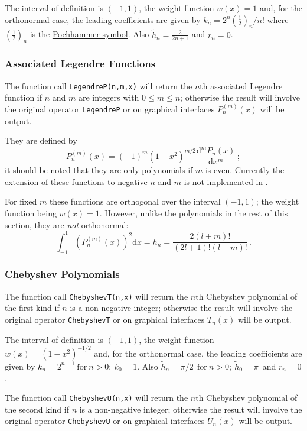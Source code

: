The interval of definition is $(-1, 1)$, the weight function $w(x)=1$ and,
for the orthonormal case, the leading coefficients are given by
$k_n=2^n (\frac{1}{2})_n/n!$ where $(\frac{1}{2})_n$ is the
\hyperlink{POCH}{Pochhammer symbol}.
Also $\tilde{h}_n = \frac{2}{2 n +1}$ and $r_n =0$.

\subsubsection{Associated Legendre Functions}
The function call \texttt{LegendreP(n,m,x)} will return the $n$th associated
Legendre function if $n$ and $m$ are integers with $0 \leq m \leq n$;
otherwise the result will involve the original operator \texttt{LegendreP} or
on graphical interfaces $P_n^{(m)}(x)$ will be output.

They are defined by
$$P_n^{(m)}(x) = (-1)^m(1-x^2)^{m/2}\frac{\mathrm{d}^m P_n(x)}{\mathrm{d}x^m}\,;$$
it should be noted that they are only polynomials if $m$ is even. Currently
the extension of these functions to negative $n$ and $m$ is not implemented
in \REDUCE.

For fixed $m$ these functions are orthogonal over the interval $(-1, 1)$;
the weight function being $w(x)=1$. However, unlike the polynomials in the rest
of this section, they are \emph{not} orthonormal:
$$\int_{-1}^1 \left(P_n^{(m)}(x)\right)^2 \mathrm{d}x = h_n =
\frac{2(l+m)!}{(2l+1)!(l-m)!}\,.$$

\subsubsection{Chebyshev Polynomials}
\hypertarget{CHEBYSHEVP}{}
 
The function call \texttt{ChebyshevT(n,x)} will return the $n$th Chebyshev
polynomial of the first kind if $n$ is a non-negative integer; otherwise the
result will involve the original operator \texttt{ChebyshevT} or on graphical
interfaces $T_n(x)$ will be output.

The interval of definition is $(-1, 1)$, the weight function
$w(x)=(1-x^2)^{-1/2}$ and, for the orthonormal case, the leading
coefficients are given by $k_n= 2^{n-1}\ \mbox{for}\ n>0;\ k_0 =1$. Also
$\tilde{h}_n = \pi/2\ \ \mbox{for}\ n>0;\ \tilde{h}_0 =\pi\,$ and $r_n=0$.

The function call \texttt{ChebyshevU(n,x)} will return the $n$th Chebyshev
polynomial of the second kind if $n$ is a non-negative integer; otherwise the
result will involve the original operator \texttt{ChebyshevU} or on graphical
interfaces $U_n(x)$ will be output.

